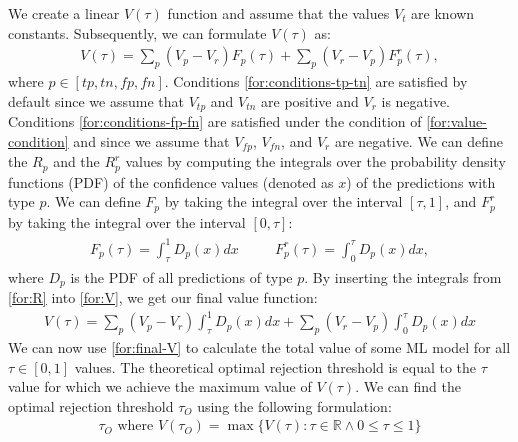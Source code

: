 %
%
We create a linear $V(\tau)$ function and assume that the values $V_t$ are known constants.
%
Subsequently, we can formulate $V(\tau)$ as:
\begin{align}
    \label{for:V}
    V(\tau) = \sum_{p} (V_p - V_r)F_p(\tau) + \sum_{p} (V_r - V_p)F^r_{p}(\tau),
\end{align}
%
where $p \in [tp, tn, fp, fn]$.
%
Conditions \ref{for:conditions-tp-tn} are satisfied by default since we assume that $V_{tp}$ and $V_{tn}$ are positive and $V_r$ is negative.
%
Conditions \ref{for:conditions-fp-fn} are satisfied under the condition of \ref{for:value-condition} and since we assume that $V_{fp}$, $V_{fn}$, and $V_r$ are negative.
% 
We can define the $R_p$ and the $R_p^r$ values by computing the integrals over the probability density functions (PDF) of the confidence values (denoted as $x$) of the predictions with type $p$.
%
We can define $F_p$ by taking the integral over the interval $[\tau, 1]$, and $F_p^r$ by taking the integral over the interval $[0, \tau]$:
%
\begin{align}
    \label{for:R}
    \begin{aligned}
        F_{p}(\tau) = \int_\tau^1 D_p(x)dx & \quad & F_p^r(\tau) = \int_0^\tau D_p(x)dx,
    \end{aligned}
\end{align}
%
where $D_p$ is the PDF of all predictions of type $p$.
%
By inserting the integrals from \ref{for:R} into \ref{for:V}, we get our final value function:
%
\begin{align}
    \label{for:final-V}
    V(\tau) = \sum_p (V_p - V_r)\int_\tau^1 D_p(x)dx + \sum_p (V_r - V_p)\int_0^\tau D_p(x)dx
\end{align}
%
We can now use \ref{for:final-V} to calculate the total value of some ML model for all $\tau \in [0, 1]$ values.
%
The theoretical optimal rejection threshold is equal to the $\tau$ value for which we achieve the maximum value of $V(\tau)$.
%
We can find the optimal rejection threshold $\tau_O$ using the following formulation:
%
\begin{align}
    \label{for:optimal-threshold}
    \tau_O \text{ where } V(\tau_O) = \max \{V(\tau): \tau \in \mathbb{R} \wedge 0 \leq \tau \leq 1 \}
\end{align}

